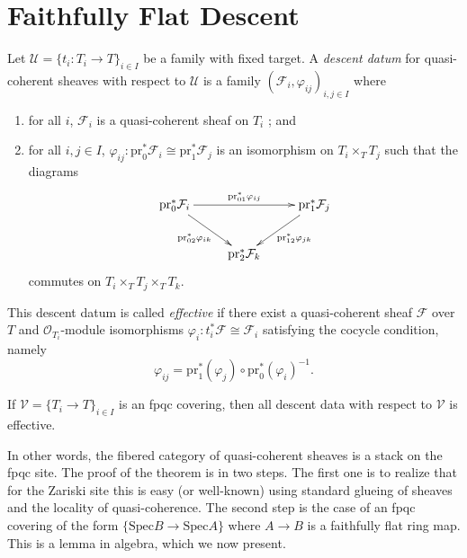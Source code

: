 \section{Faithfully Flat Descent}
\label{section-fpqc-descent}

\begin{definition}
\label{definition-descent-datum}
Let $\mathcal{U} = \{ t_i : T_i \to T\}_{i \in I}$ be a family with fixed 
target. A {\it descent datum} for quasi-coherent sheaves with respect to 
$\mathcal{U}$ is a family $(\mathcal{F}_i, \varphi_{ij})_{i,j\in I}$ where
\begin{enumerate}
\item for all $i$, $\mathcal{F}_i$ is a quasi-coherent sheaf on $T_i$ ; and
\item for all $i, j \in I$, $\varphi_{ij} : \text{pr}_0^* \mathcal{F}_i \cong 
\text{pr}_1^* \mathcal{F}_j$ is an isomorphism on $T_i \times_T T_j$ such that 
the diagrams
$$
\xymatrix{
{\text{pr}_0^* \mathcal{F}_i} \ar_{\text{pr}_{02}^*\varphi_{ik}}[dr] 
\ar^{\text{pr}_{01}^*\varphi_{ij}}[rr] & & {\text{pr}_1^* 
\mathcal{F}_j}\ar^{\text{pr}_{12}^*\varphi_{jk}}[dl] \\
& {\text{pr}_2^* \mathcal{F}_k}  
}
$$ 
commutes on $T_i \times_T T_j \times_T T_k$.
\end{enumerate}
This descent datum is called {\it effective} if there exist a quasi-coherent 
sheaf $\mathcal{F}$ over $T$ and $\mathcal{O}_{T_i}$-module isomorphisms 
$\varphi_i : t_i^* \mathcal{F} \cong \mathcal{F}_i$ satisfying the cocycle 
condition, namely
$$
\varphi_{ij} = \text{pr}_1^* (\varphi_j) \circ \text{pr}_0^* (\varphi_i)^{-1}.
$$
\end{definition}

\begin{theorem}
\label{theorem-descent-quasi-coherent}
If $\mathcal{V} = \{T_i \to T\}_{i\in I}$ is an fpqc covering, then all 
descent data with respect to $\mathcal{V}$ is effective.
\end{theorem}

\noindent
In other words, the fibered category of quasi-coherent sheaves is a stack on 
the fpqc site.
The proof of the theorem is in two steps. The first one is to realize that for 
the Zariski site this is easy (or well-known) using standard glueing of sheaves 
and the locality of quasi-coherence. The second step is the case of an 
fpqc covering of the form $\{ \text{Spec} B \to \text{Spec} A\}$ where $A \to 
B$ is a faithfully flat ring map. This is a lemma in algebra, which we now 
present.

